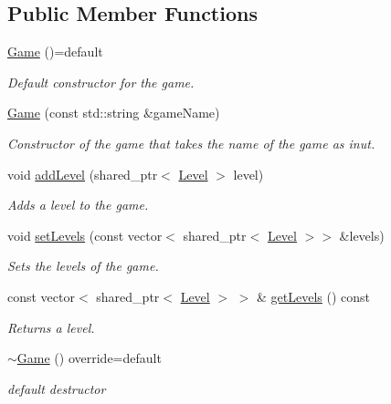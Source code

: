 \subsection*{Public Member Functions}
\begin{DoxyCompactItemize}
\item 
\mbox{\label{classGame_a4735989677c1cab18866f3ae4ee0aa1c}} 
\hyperlink{classGame_a4735989677c1cab18866f3ae4ee0aa1c}{Game} ()=default
\begin{DoxyCompactList}\small\item\em Default constructor for the game. \end{DoxyCompactList}\item 
\hyperlink{classGame_a390a5384cd8ed6839148d036499b2d95}{Game} (const std\+::string \&game\+Name)
\begin{DoxyCompactList}\small\item\em Constructor of the game that takes the name of the game as inut. \end{DoxyCompactList}\item 
void \hyperlink{classGame_aa85c4d8154aff77cd064b859ea6c1da2}{add\+Level} (shared\+\_\+ptr$<$ \hyperlink{classLevel}{Level} $>$ level)
\begin{DoxyCompactList}\small\item\em Adds a level to the game. \end{DoxyCompactList}\item 
void \hyperlink{classGame_ad130d02a37e7754ff619d8b28c5d52ea}{set\+Levels} (const vector$<$ shared\+\_\+ptr$<$ \hyperlink{classLevel}{Level} $>$$>$ \&levels)
\begin{DoxyCompactList}\small\item\em Sets the levels of the game. \end{DoxyCompactList}\item 
const vector$<$ shared\+\_\+ptr$<$ \hyperlink{classLevel}{Level} $>$ $>$ \& \hyperlink{classGame_a7054929dc897593d0d5bace74398df9b}{get\+Levels} () const
\begin{DoxyCompactList}\small\item\em Returns a level. \end{DoxyCompactList}\item 
\mbox{\label{classGame_a09ffcdf9d805fd9a407f68865661373d}} 
\hyperlink{classGame_a09ffcdf9d805fd9a407f68865661373d}{$\sim$\+Game} () override=default
\begin{DoxyCompactList}\small\item\em default destructor \end{DoxyCompactList}\end{DoxyCompactItemize}


